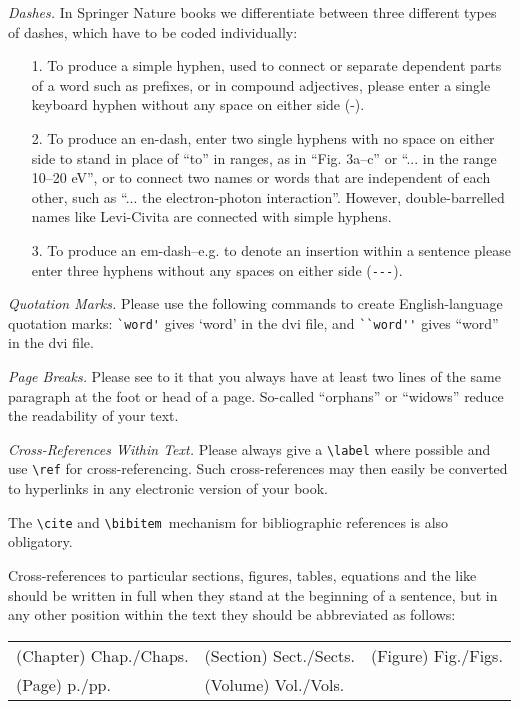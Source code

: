 \documentclass[graybox]{svmult}
\begin{document}
\begin{refguide}
\begin{sloppy}
{\it Dashes.} In Springer Nature books we differentiate between three different types of dashes, which have to be coded individually:

\begin{enumerate}
\item[1.] To produce a simple hyphen, used to connect or separate dependent parts of a word such as prefixes, or in compound adjectives, please enter a single keyboard hyphen without any space on either side (-).
\item[2.] To produce an en-dash, enter two single hyphens with no space on either side to stand in place of ``to'' in ranges, as in ``Fig. 3a--c'' or ``... in the range 10--20 eV'', or to connect two names or words that are independent of each other, such as ``... the electron-photon interaction''. However, double-barrelled names like Levi-Civita are connected with simple hyphens.
\item[3.] To produce an em-dash--e.g. to denote an insertion within a sentence please enter three hyphens without any spaces on either side (\verb|---|).
\end{enumerate}


{\it Quotation Marks.} Please use the following commands to create English-language quotation marks: \verb|`word'| gives `word' in the dvi file, and \verb|``word''| gives ``word'' in the dvi file.

{\it Page Breaks.} Please see to it that you always have at least two lines of the same paragraph at the foot or head of a page. So-called ``orphans'' or ``widows'' reduce the readability of your text.

{\it Cross-References Within Text.} Please always give a \verb|\label| where possible and use \verb|\ref| for cross-referencing. Such cross-references may then easily be converted to hyperlinks in any electronic version of your book.

The \verb|\cite| and \verb|\bibitem|~mechanism for bibliographic references is also obligatory.

Cross-references to particular sections, figures, tables, equations and the like should be written in full when they stand at the beginning of a sentence, but in any other position within the text they should be abbreviated as follows:

\begin{tabular}{l@{\quad}l@{\quad}l}
(Chapter) Chap./Chaps. & (Section) Sect./Sects. & (Figure) Fig./Figs. \\
(Page) p./pp. & (Volume) Vol./Vols.
\end{tabular}


\end{sloppy}
\end{refguide}
\end{document}
